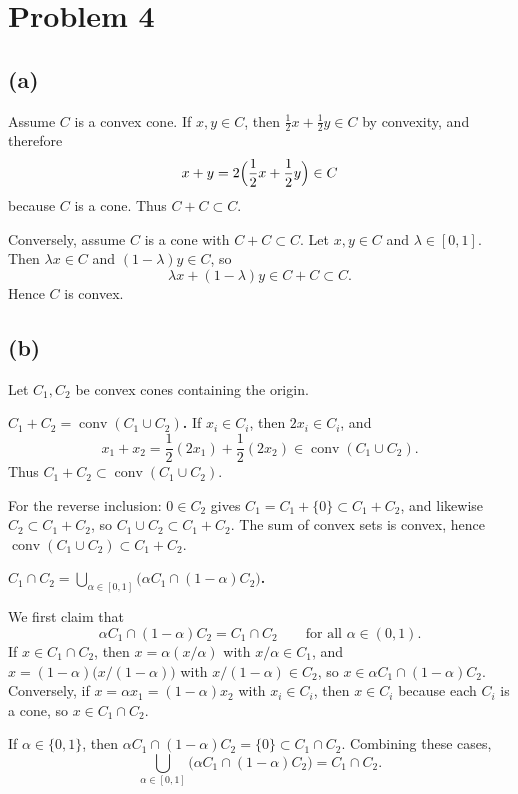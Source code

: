 \documentclass[11pt]{article}
\begin{document}
\section*{Problem 4}

\subsection*{(a)}

Assume $C$ is a convex cone. If $x,y\in C$, then $\frac{1}{2}x+\frac{1}{2}y\in C$ by convexity, and therefore
\[
x+y = 2\Bigl(\frac{1}{2}x+\frac{1}{2}y\Bigr)\in C
\]
because $C$ is a cone. Thus $C+C\subset C$.

Conversely, assume $C$ is a cone with $C+C\subset C$. Let $x,y\in C$ and $\lambda\in[0,1]$. Then $\lambda x\in C$ and $(1-\lambda)y\in C$, so
\[
\lambda x+(1-\lambda)y\in C+C\subset C.
\]
Hence $C$ is convex.

\subsection*{(b)}

Let $C_1,C_2$ be convex cones containing the origin.

\textbf{$C_1+C_2=\operatorname{conv}(C_1\cup C_2)$.}
If $x_i\in C_i$, then $2x_i\in C_i$, and
\[
x_1+x_2 = \frac{1}{2}(2x_1)+\frac{1}{2}(2x_2)\in\operatorname{conv}(C_1\cup C_2).
\]
Thus $C_1+C_2\subset\operatorname{conv}(C_1\cup C_2)$.

For the reverse inclusion: $0\in C_2$ gives $C_1=C_1+\{0\}\subset C_1+C_2$, and likewise $C_2\subset C_1+C_2$, so $C_1\cup C_2\subset C_1+C_2$. The sum of convex sets is convex, hence $\operatorname{conv}(C_1\cup C_2)\subset C_1+C_2$.

\textbf{$C_1\cap C_2=\displaystyle\bigcup_{\alpha\in[0,1]}\bigl(\alpha C_1\cap(1-\alpha)C_2\bigr)$.}

We first claim that
\[
\alpha C_1\cap(1-\alpha)C_2 = C_1\cap C_2 \qquad\text{for all }\alpha\in(0,1).
\]
If $x\in C_1\cap C_2$, then $x=\alpha(x/\alpha)$ with $x/\alpha\in C_1$, and $x=(1-\alpha)\bigl(x/(1-\alpha)\bigr)$ with $x/(1-\alpha)\in C_2$, so $x\in\alpha C_1\cap(1-\alpha)C_2$. Conversely, if $x=\alpha x_1=(1-\alpha)x_2$ with $x_i\in C_i$, then $x\in C_i$ because each $C_i$ is a cone, so $x\in C_1\cap C_2$.

If $\alpha\in\{0,1\}$, then $\alpha C_1\cap(1-\alpha)C_2=\{0\}\subset C_1\cap C_2$. Combining these cases,
\[
\bigcup_{\alpha\in[0,1]}\bigl(\alpha C_1\cap(1-\alpha)C_2\bigr) = C_1\cap C_2.
\]
\end{document}
